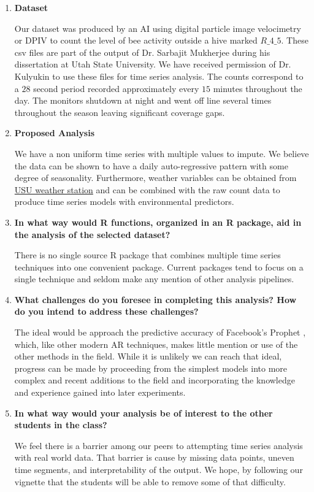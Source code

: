 \documentclass[12pt]{report}\usepackage[]{graphicx}\usepackage[]{color}
\begin{document}
\begin{enumerate}
\item {\bf Dataset}

Our dataset was produced by an AI using digital particle image velocimetry or DPIV \href{https://www.researchgate.net/figure/Directional-DPIV-based-bee-motion-estimation-algorithm_fig1_340021624}{\cite{Willert1991}} to count the level of bee activity outside a hive marked $R\_4\_5$. These csv files are part of the output of Dr. Sarbajit Mukherjee during his dissertation at Utah State University. We have received permission of Dr. Kulyukin to use these files for time series analysis. The counts correspond to a $28$ second period recorded approximately every $15$ minutes throughout the day. The monitors shutdown at night and went off line several times throughout the season leaving significant coverage gaps.

\item {\bf Proposed Analysis}

We have a non uniform time series with multiple values to impute. We believe the data can be shown to have a daily auto-regressive pattern with some degree of seasonality. Furthermore, weather variables can be obtained from \href{https://climate.usu.edu/mchd/dashboard/dashboard.php?network=USUwx&station=1279257&units=E&showgraph=0&}{USU weather station} and can be combined with the raw count data to produce time series models with environmental predictors.

\item {\bf In what way would R functions, organized in an R package, aid in the analysis of the selected dataset? }

There is no single source R package that combines multiple time series techniques into one convenient package. Current packages tend to focus on a single technique and seldom make any mention of other analysis pipelines.

\item {\bf What challenges do you foresee in completing this analysis? How do you intend to address these challenges? }

The ideal would be approach the predictive accuracy of Facebook's Prophet \href{https://facebook.github.io/prophet/}{\cite{taylor2017scale}}, which, like other modern AR techniques, makes little mention or use of the other methods in the field. While it is unlikely we can reach that ideal, progress can be made by proceeding from the simplest models into more complex and recent additions to the field and incorporating the knowledge and experience gained into later experiments.

\item {\bf In what way would your analysis be of interest to the other students in the class? }

We feel there is a barrier among our peers to attempting time series analysis with real world data. That barrier is cause by missing data points, uneven time segments, and interpretability of the output. We hope, by following our vignette that the students will be able to remove some of that difficulty.

\end{enumerate}


\end{document}
